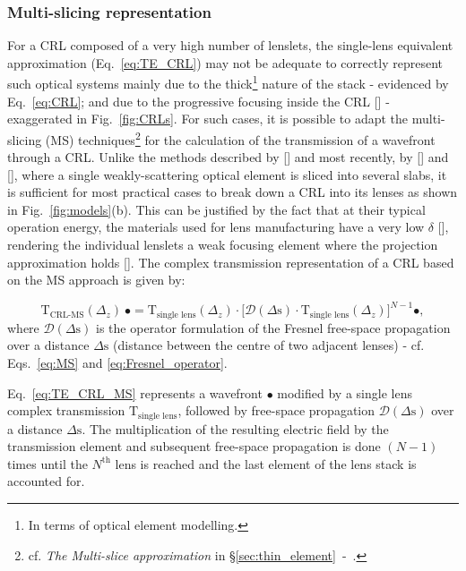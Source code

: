 \begin{refsection}
\subsubsection*{Multi-slicing representation}

For a CRL composed of a very high number of lenslets, the single-lens equivalent approximation (Eq.~\ref{eq:TE_CRL}) may not be adequate to correctly represent such optical systems mainly due to the thick\footnote{In terms of optical element modelling.} nature of the stack  - evidenced by Eq.~\ref{eq:CRL}; and due to the progressive focusing inside the CRL [\cite{Schroer2005}] - exaggerated in Fig.~\ref{fig:CRLs}. For such cases, it is possible to adapt the multi-slicing (MS) techniques\footnote{cf. \textit{The Multi-slice approximation} in \S\ref{sec:thin_element}~-~\textit{}.} for the calculation of the transmission of a wavefront through a CRL. Unlike the methods described by [\cite{Paganin2006}] and most recently, by [\cite{Li2017}] and [\cite{Munro2019}], where a single weakly-scattering optical element is sliced into several slabs, it is sufficient for most practical cases to break down a CRL into its lenses as shown in  Fig.~\ref{fig:models}(b). This can be justified by the fact that at their typical operation energy, the materials used for lens manufacturing have a very low $\delta$ [\cite{Serebrennikov2016}], rendering the individual lenslets a weak focusing element where the projection approximation holds [\cite{Protopopov1998}]. The complex transmission representation of a CRL based on the MS approach is given by:

\begin{equation}\label{eq:TE_CRL_MS}
    \mathrm{T}_{\text{CRL-MS}}(\Delta_z)~\bullet = \mathrm{T}_{\text{single lens}}(\Delta_z)\cdot\big[\mathcal{D}({\Delta}\text{s})\cdot\mathrm{T}_{\text{single lens}}(\Delta_z)\big]^{N-1}\bullet,
\end{equation}{}
where $\mathcal{D}({\Delta}\text{s})$ is the operator formulation of the Fresnel free-space propagation over a distance $\Delta\text{s}$ (distance between the centre of two adjacent lenses) - cf. Eqs.~\ref{eq:MS} and \ref{eq:Fresnel_operator}. 

Eq.~\ref{eq:TE_CRL_MS} represents a wavefront $\bullet$ modified by a single lens complex transmission $\mathrm{T}_{\text{single lens}}$, followed by free-space propagation $\mathcal{D}({\Delta}\text{s})$ over a distance $\Delta \text{s}$. The multiplication of the resulting electric field by the transmission element and subsequent free-space propagation is done $(N-1)$ times until the $N^{\text{th}}$ lens is reached and the last element of the lens stack is accounted for.


\end{refsection}
